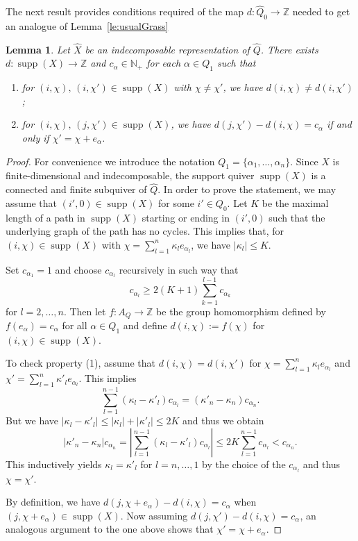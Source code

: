 \documentclass{amsart}
\newtheorem{lemma}[theorem]{Lemma}
\numberwithin{equation}{section}
\newcommand{\ZZ}{\mathbb{Z}}
\newcommand{\supp}{\operatorname{supp}}
\begin{document}
The next result provides conditions required of the map $d:\hat Q_0\to\ZZ$ needed to get an analogue of Lemma~\ref{le:usualGrass}
\begin{lemma}
  \label{le:degree condition} 
  Let $\hat X$ be an indecomposable representation of $\hat Q$.
  There exists $d:\supp(X)\to\ZZ$ and $c_\alpha\in\mathbb N_+$ for each $\alpha\in Q_1$ such that
  \begin{enumerate}
    \item for $(i,\chi),\,(i,\chi')\in\supp(X)$ with $\chi\neq\chi'$, we have $d(i,\chi)\ne d(i,\chi')$;
    \item for $(i,\chi),\,(j,\chi')\in\supp(X)$, we have $d(j,\chi')-d(i,\chi)=c_\alpha$ if and only if $\chi'=\chi+e_\alpha$.
  \end{enumerate}
\end{lemma}
\begin{proof}
  For convenience we introduce the notation $Q_1=\{\alpha_1,\ldots,\alpha_n\}$.
  Since $X$ is finite-dimensional and indecomposable, the support quiver $\supp(X)$ is a connected and finite subquiver of $\hat Q$.
  In order to prove the statement, we may assume that $(i',0)\in\supp(X)$ for some $i'\in Q_0$.
  Let $K$ be the maximal length of a path in $\supp(X)$ starting or ending in $(i',0)$ such that the underlying graph of the path has no cycles.
  This implies that, for $(i,\chi)\in\supp(X)$ with $\chi=\sum_{l=1}^n \kappa_l e_{\alpha_l}$, we have $|\kappa_l|\leq K$.

  Set $c_{\alpha_1}=1$ and choose $c_{\alpha_l}$ recursively in such way that 
  \[c_{\alpha_l}\geq 2(K+1)\sum_{k=1}^{l-1} c_{\alpha_k}\]
  for $l=2,\ldots,n$.  
  Then let $f:A_Q\to\ZZ$ be the group homomorphism defined by $f(e_\alpha)=c_\alpha$ for all $\alpha\in Q_1$ and define $d(i,\chi):=f(\chi)$ for $(i,\chi)\in\supp(X)$.

  To check property (1), assume that $d(i,\chi)=d(i,\chi')$ for $\chi=\sum_{l=1}^n \kappa_l e_{\alpha_l}$ and $\chi'=\sum_{l=1}^n \kappa'_l e_{\alpha_l}$.
  This implies
  \[\sum_{l=1}^{n-1}(\kappa_l-\kappa'_l)c_{\alpha_l}=(\kappa'_n-\kappa_n)c_{\alpha_n}.\]
  But we have $|\kappa_l-\kappa'_l|\leq |\kappa_l|+|\kappa'_l|\le 2K$ and thus we obtain 
  \[|\kappa'_n-\kappa_n|c_{\alpha_n}=\left|\sum_{l=1}^{n-1}(\kappa_l-\kappa'_l)c_{\alpha_l}\right|\le 2K\sum_{l=1}^{n-1}c_{\alpha_l} < c_{\alpha_n}.\]
  This inductively yields $\kappa_l=\kappa'_l$ for $l=n,\ldots,1$ by the choice of the $c_{\alpha_l}$ and thus $\chi=\chi'$. 

  By definition, we have $d(j,\chi+e_\alpha)-d(i,\chi)=c_\alpha$ when $(j,\chi+e_\alpha)\in\supp(X)$.
  Now assuming $d(j,\chi')-d(i,\chi)=c_\alpha$, an analogous argument to the one above shows that $\chi'=\chi+e_\alpha$.
\end{proof}
\end{document}
